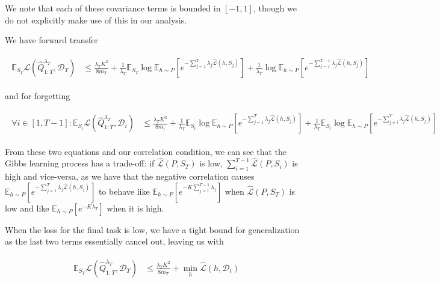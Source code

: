 \documentclass[letterpaper]{article}
\theoremstyle{definition}
\begin{document}
We note that each of these covariance terms is bounded in $[-1,1]$, though we do not explicitly make use of this in our analysis.

We have forward transfer 

\begin{align} 
\begin{split}
\mathbb{E}_{S_T}\mathcal{L}(\hat{Q}^{\lambda_T}_{1:T}, \mathcal{D}_T) &\leq \frac{\lambda_T K^2}{8m_T}+\frac{1}{\lambda_T}\mathbb{E}_{S_T}\log\mathbb{E}_{h\sim P}\left [e^{-\sum_{j=1}^{T}\lambda_j\hat{\mathcal{L}}(h,S_j)} \right ]+\frac{1}{\lambda_T}\log\mathbb{E}_{h\sim P}\left [e^{-\sum_{j=1}^{T-1}\lambda_j\hat{\mathcal{L}}(h,S_j)} \right ]
\end{split}
\end{align}

and for forgetting

\begin{align} 
\begin{split}
\forall i\in[1,T-1]:
\mathbb{E}_{S_i}\mathcal{L}(\hat{Q}^{\lambda_T}_{1:T}, \mathcal{D}_i) &\leq \frac{\lambda_T K^2}{8m_i}+\frac{1}{\lambda_T}\mathbb{E}_{S_i}\log\mathbb{E}_{h\sim P}\left [e^{-\sum_{j=1}^{T}\lambda_j\hat{\mathcal{L}}(h,S_j)} \right ]+\frac{1}{\lambda_T}\mathbb{E}_{S_i}\log\mathbb{E}_{h\sim P}\left [e^{-\sum_{j\neq i}^{T}\lambda_j\hat{\mathcal{L}}(h,S_j)} \right ]
\end{split}
\end{align}

From these two equations and our correlation condition, we can see that the Gibbs learning process has a trade-off: if $\hat{\mathcal{L}}(P,S_T)$ is low, $\sum_{i=1}^{T-1}\hat{\mathcal{L}}(P,S_i)$ is high and vice-versa, as we have that the negative correlation causes $\mathbb{E}_{h\sim P}\left [e^{-\sum_{j=1}^{T}\lambda_j\hat{\mathcal{L}}(h,S_j)} \right ]$ to behave like $\mathbb{E}_{h\sim P}\left [e^{-K\sum_{j=1}^{T-1}\lambda_j} \right ]$ when $\hat{\mathcal{L}}(P,S_T)$ is low and like $\mathbb{E}_{h\sim P}\left [e^{-K\lambda_T} \right ]$ when it is high.

When the loss for the final task is low, we have a tight bound for generalization as the last two terms essentially cancel out, leaving us with 

\begin{align} 
\begin{split}
\mathbb{E}_{S_T}\mathcal{L}(\hat{Q}^{\lambda_T}_{1:T}, \mathcal{D}_T) &\leq \frac{\lambda_T K^2}{8m_T}+\min_h \hat{\mathcal{L}}(h,\mathcal{D}_t)
\end{split}
\end{align}
\end{document}
